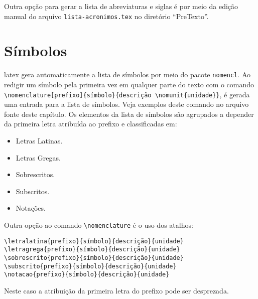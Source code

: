 Outra opção para gerar a lista de abreviaturas e siglas é por meio da edição manual do arquivo \texttt{lista-acronimos.tex} no diretório ``PreTexto''.

\section{Símbolos}\label{sec:simbolos}

\gls{latex} gera automaticamente a lista de símbolos por meio do pacote \texttt{nomencl}. Ao redigir um símbolo pela primeira vez em qualquer parte do texto com o comando \verb|\nomenclature[prefixo]{símbolo}{descrição \nomunit{unidade}}|, é gerada uma entrada para a lista de símbolos. Veja exemplos deste comando no arquivo fonte deste capítulo. Os elementos da lista de símbolos são agrupados a depender da primeira letra atribuída ao prefixo e classificadas em:

\begin{itemize}%
    \item Letras Latinas.
    \item Letras Gregas.
    \item Sobrescritos.
    \item Subscritos.
    \item Notações.
\end{itemize}

Outra opção ao comando \verb|\nomenclature| é o uso dos atalhos:

\begin{SingleSpacing}%
    \begin{verbatim}
\letralatina{prefixo}{símbolo}{descrição}{unidade}
\letragrega{prefixo}{símbolo}{descrição}{unidade}
\sobrescrito{prefixo}{símbolo}{descrição}{unidade}
\subscrito{prefixo}{símbolo}{descrição}{unidade}
\notacao{prefixo}{símbolo}{descrição}{unidade}
\end{verbatim}
\end{SingleSpacing}

\noindent Neste caso a atribuição da primeira letra do prefixo pode ser desprezada.


